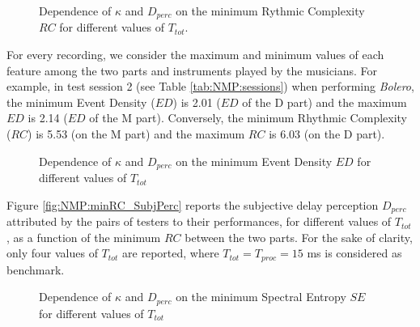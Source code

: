 \begin{figure}[!tb]
\begin{flushright}
    \hfil
\end{flushright}
\caption{Dependence of $\kappa$ and $D_{perc}$ on the minimum Rythmic Complexity $RC$ for different values of $T_{tot}$.}
\label{fig:NMP:minRC}
\end{figure}


 

For every recording, we consider the maximum and minimum values of each feature among the two parts and instruments played by the musicians. For example, in test session 2 (see Table \ref{tab:NMP:sessions}) when performing \textit{Bolero}, the minimum Event Density ($ED$) is 2.01 ($ED$ of the D part) and the maximum $ED$ is 2.14 ($ED$ of the M part). Conversely, the minimum Rhythmic Complexity ($RC$) is 5.53 (on the M part) and the maximum $RC$ is 6.03 (on the D part).

\begin{figure}[!tb]
\begin{flushright}
    \hfil
\end{flushright}
\caption{Dependence of $\kappa$ and $D_{perc}$ on the minimum Event Density $ED$ for different values of $T_{tot}$}
\label{fig:NMP:minED}
\end{figure}

Figure \ref{fig:NMP:minRC_SubjPerc} reports the subjective delay perception $D_{perc}$ attributed by the pairs of testers to their performances, for different values of $T_{tot}$, as a function of the minimum $RC$ between the two parts. For the sake of clarity, only four values of $T_{tot}$ are reported, where $T_{tot}=T_{proc}=15$ ms is considered as benchmark. 

\begin{figure}[!tb]
\begin{flushright}
    \hfil
\end{flushright}
\caption{Dependence of $\kappa$ and $D_{perc}$ on the minimum Spectral Entropy $SE$ for different values of $T_{tot}$}
\label{fig:NMP:minSE}
\end{figure}


